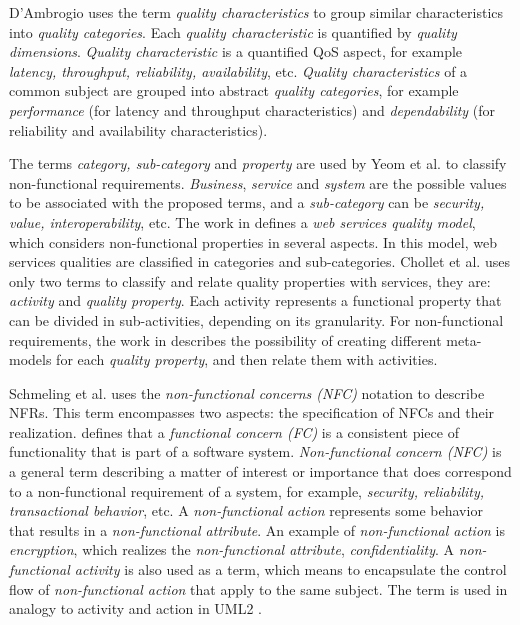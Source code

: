 D'Ambrogio \cite{DAmbrogio06} uses the term \textit{quality characteristics}
to group similar characteristics into \textit{quality categories}. Each
\textit{quality characteristic} is quantified by \textit{quality dimensions}.
\textit{Quality characteristic} is a quantified QoS aspect, for example
\textit{latency, throughput, reliability, availability}, etc. \textit{Quality
characteristics} of a common subject are grouped into abstract \textit{quality
categories}, for example \textit{performance} (for latency and throughput characteristics) and
\textit{dependability} (for reliability and availability characteristics).  
 
The terms \textit{category, sub-category}
and \textit{property}  are used by Yeom
et al.\cite{Yeom2006} to classify non-functional requirements.
\textit{Business}, \textit{service} and \textit{system} are the possible values to be associated
with the proposed terms, and a \textit{sub-category} can be \textit{security,
value, interoperability}, etc. The work in \cite{Yeom2006} defines a \textit{web
services quality model}, which considers non-functional properties in several
aspects. In this model, web services qualities are classified in categories and
sub-categories. Chollet et al.\cite{CholletL09} uses only two terms to
classify and relate quality properties with services, they are:
\textit{activity} and \textit{quality property}. Each activity represents a
functional property that can be divided in sub-activities, depending on its
granularity. For non-functional requirements, the work in \cite{CholletL09}
describes the possibility of creating different meta-models for each
\textit{quality property}, and then relate them with activities.   


Schmeling et al.\cite{SchmelingCM11} uses the 
\textit{non-functional concerns (NFC)} notation to describe NFRs. This term
encompasses two aspects: the specification of NFCs and their realization.
\cite{SchmelingCM11} defines that a \textit{functional concern (FC)} is a
consistent piece of functionality that is part of a software system.
\textit{Non-functional concern (NFC)} is a general term describing a matter of interest or importance that does correspond
to a non-functional requirement of a system, for example, \textit{security,
reliability, transactional behavior}, etc. A \textit{non-functional action} represents some
behavior that results in a \textit{non-functional attribute}. An example of
\textit{non-functional action} is \textit{encryption}, which realizes the \textit{non-functional attribute},
\textit{confidentiality}. A \textit{non-functional activity} is also used as a
term, which means to encapsulate the control flow of \textit{non-functional
action} that apply to the same subject. The term is used in analogy to activity
and action in UML2 .

